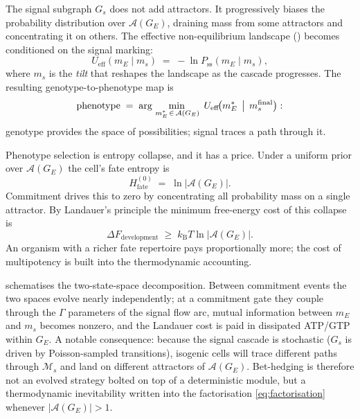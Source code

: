 \documentclass[11pt,a4paper]{article}
\newcommand{\kB}{k_{\mathrm{B}}}
\newcommand{\Gs}{G_s}
\newcommand{\Ge}{G_E}
\newcommand{\DeltaF}{\Delta F}
\newcommand{\Aset}{\mathcal{A}}
\newcommand{\Hfate}{H_{\mathrm{fate}}}
\begin{document}
The signal subgraph \(\Gs\) does not add attractors.  It progressively
biases the probability distribution over \(\Aset(\Ge)\), draining mass
from some attractors and concentrating it on others.  The effective
non-equilibrium landscape () becomes
conditioned on the signal marking:
\begin{equation}
  U_{\mathrm{eff}}(m_E \mid m_s) \;=\; -\ln P_{\mathrm{ss}}(m_E \mid m_s),
  \label{eq:tilted-landscape}
\end{equation}
where \(m_s\) is the \emph{tilt} that reshapes the landscape as the
cascade progresses.  The resulting genotype-to-phenotype map is
\begin{equation}
  \mathrm{phenotype} \;=\;
  \arg\min_{\,m_E^{*} \,\in\, \Aset(\Ge)} \;
  U_{\mathrm{eff}}\!\bigl(m_E^{*} \,\bigm|\, m_s^{\mathrm{final}}\bigr):
  \label{eq:argmin}
\end{equation}
genotype provides the space of possibilities; signal traces a path through it.

Phenotype selection is entropy collapse, and it has a price.  Under a
uniform prior over \(\Aset(\Ge)\) the cell's fate entropy is
\begin{equation}
  \Hfate^{(0)} \;=\; \ln\bigl|\Aset(\Ge)\bigr|.
  \label{eq:H0}
\end{equation}
Commitment drives this to zero by concentrating all probability mass
on a single attractor.  By Landauer's principle the minimum free-energy
cost of this collapse is
\begin{equation}
  \boxed{\;\DeltaF_{\mathrm{development}} \;\geq\;
  \kB T \ln\bigl|\Aset(\Ge)\bigr|.\;}
  \label{eq:dev-cost}
\end{equation}
An organism with a richer fate repertoire pays proportionally more;
the cost of multipotency is built into the thermodynamic accounting.

 schematises the two-state-space decomposition.
Between commitment events the two spaces evolve nearly independently;
at a commitment gate they couple through the \(\Gamma\) parameters of
the signal flow arc, mutual information between \(m_E\) and \(m_s\)
becomes nonzero, and the Landauer cost is paid in dissipated ATP/GTP
within \(\Ge\).  A notable consequence: because the signal cascade
is stochastic (\(\Gs\) is driven by Poisson-sampled transitions),
isogenic cells will trace different paths through \(\mathcal{M}_s\) and
land on different attractors of \(\Aset(\Ge)\).  Bet-hedging is therefore
not an evolved strategy bolted on top of a deterministic module, but a
thermodynamic inevitability written into the factorisation
\eqref{eq:factorisation} whenever \(|\Aset(\Ge)| > 1\).
\end{document}
